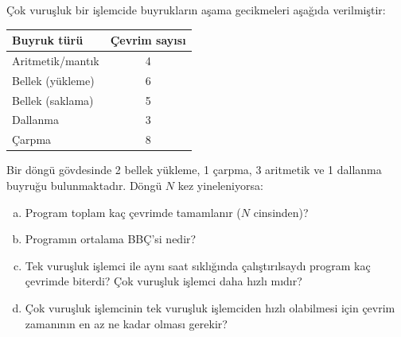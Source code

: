 \begin{alistirma}[\orta]
Çok vuruşluk bir işlemcide buyrukların aşama gecikmeleri aşağıda verilmiştir:

\begin{center}
\small
\begin{tabular}{lc}
\toprule
\textbf{Buyruk türü} & \textbf{Çevrim sayısı} \\
\midrule
Aritmetik/mantık & 4 \\
Bellek (yükleme) & 6 \\
Bellek (saklama) & 5 \\
Dallanma & 3 \\
Çarpma & 8 \\
\bottomrule
\end{tabular}
\end{center}

Bir döngü gövdesinde 2 bellek yükleme, 1 çarpma, 3 aritmetik ve 1 dallanma buyruğu bulunmaktadır. Döngü $N$ kez yineleniyorsa:
\begin{enumerate}[(a)]
    \item Program toplam kaç çevrimde tamamlanır ($N$ cinsinden)?
    \item Programın ortalama BBÇ'si nedir?
    \item Tek vuruşluk işlemci ile aynı saat sıklığında çalıştırılsaydı program kaç çevrimde biterdi? Çok vuruşluk işlemci daha hızlı mıdır?
    \item Çok vuruşluk işlemcinin tek vuruşluk işlemciden hızlı olabilmesi için çevrim zamanının en az ne kadar olması gerekir?
\end{enumerate}
\end{alistirma}

